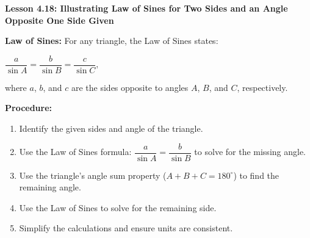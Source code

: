 \begin{center}
\textbf{Lesson 4.18: Illustrating Law of Sines for Two Sides and an Angle Opposite One Side Given}
\end{center}

\vspace*{-1.5ex}

\noindent\textbf{Law of Sines:}  
For any triangle, the Law of Sines states:  

{\centering $
\dfrac{a}{\sin A} = \dfrac{b}{\sin B} = \dfrac{c}{\sin C},
$\par}

\noindent where \(a\), \(b\), and \(c\) are the sides opposite to angles \(A\), \(B\), and \(C\), respectively.

\noindent\textbf{Procedure:}  
\begin{enumerate}
    \item Identify the given sides and angle of the triangle.  
    \item Use the Law of Sines formula: \(\dfrac{a}{\sin A} = \dfrac{b}{\sin B}\) to solve for the missing angle.  
    \item Use the triangle's angle sum property (\(A + B + C = 180^\circ\)) to find the remaining angle.  
    \item Use the Law of Sines to solve for the remaining side.  
    \item Simplify the calculations and ensure units are consistent.
\end{enumerate}

